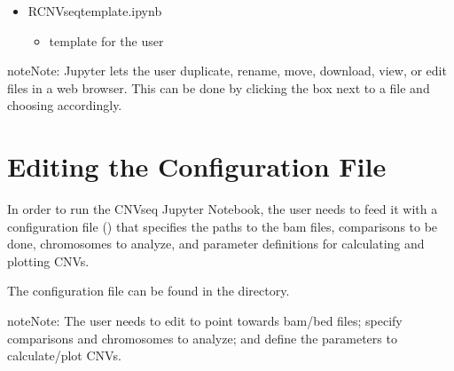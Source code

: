 \documentclass[letterpaper,10pt,english]{sphinxhowto}
\begin{document}
\begin{itemize}
\begin{itemize}
\begin{itemize}
\end{itemize}

\item {} 
\sphinxAtStartPar
RCNV\sphinxhyphen{}seq\sphinxhyphen{}template.ipynb
\begin{itemize}
\item {} 
\sphinxAtStartPar
template for the user

\end{itemize}

\end{itemize}

\end{itemize}

\begin{sphinxadmonition}{note}{Note:}
\sphinxAtStartPar
Jupyter lets the user duplicate, rename, move, download, view, or edit files in a web browser. This can be done by clicking the box next to a file and choosing accordingly.
\end{sphinxadmonition}


\section{Editing the Configuration File}
\label{\detokenize{index:editing-the-configuration-file}}
\sphinxAtStartPar
In order to run the CNV\sphinxhyphen{}seq Jupyter Notebook, the user needs to feed it with a configuration file () that specifies the paths to the bam files, comparisons to be done, chromosomes to analyze, and parameter definitions for calculating and plotting CNVs.

\sphinxAtStartPar
The configuration file  can be found in the  directory.

\begin{sphinxadmonition}{note}{Note:}
\sphinxAtStartPar
The user needs to edit  to point towards bam/bed files; specify comparisons and chromosomes to analyze; and define the parameters to calculate/plot CNVs.
\end{sphinxadmonition}
\end{document}
